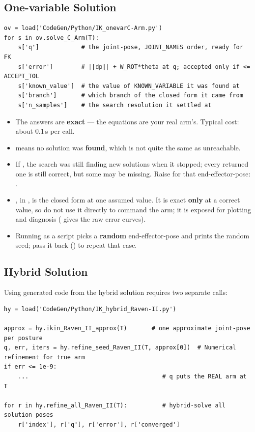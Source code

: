 \documentclass[11pt]{article}
\begin{document}
\subsection{One-variable Solution}

\begin{lstlisting}
ov = load('CodeGen/Python/IK_onevarC-Arm.py')
for s in ov.solve_C_Arm(T):
    s['q']            # the joint-pose, JOINT_NAMES order, ready for FK
    s['error']        # ||dp|| + W_ROT*theta at q; accepted only if <= ACCEPT_TOL
    s['known_value']  # the value of KNOWN_VARIABLE it was found at
    s['branch']       # which branch of the closed form it came from
    s['n_samples']    # the search resolution it settled at
\end{lstlisting}

\begin{itemize}
\item The answers are \textbf{exact} --- the equations are your real arm's.
  Typical cost:  about 0.1\,s per call.
\item \code{[]} means no solution was \textbf{found}, which is not quite the same
  as unreachable.
\item If , the search was still finding new
  solutions when it stopped;  every returned one is still correct, but some may
  be missing.  Raise  for that end-effector-pose:
  .
\item {}, in , is the
  closed form at one assumed value.  It is exact \textbf{only} at a correct
  value, so do not use it directly to command the arm;  it is exposed for
  plotting and diagnosis ( gives the raw error curves).
\item Running  as a script picks a \textbf{random}
  end-effector-pose and prints the random seed;  pass it back
  () to repeat that case.
\end{itemize}

\subsection{Hybrid Solution}

Using generated code from the hybrid solution requires two separate calls:
\begin{lstlisting}
hy = load('CodeGen/Python/IK_hybrid_Raven-II.py')

approx = hy.ikin_Raven_II_approx(T)       # one approximate joint-pose per posture
q, err, iters = hy.refine_seed_Raven_II(T, approx[0])  # Numerical refinement for true arm
if err <= 1e-9:
    ...                                      # q puts the REAL arm at T

for r in hy.refine_all_Raven_II(T):          # hybrid-solve all solution poses
    r['index'], r['q'], r['error'], r['converged']
\end{lstlisting}
\end{document}
